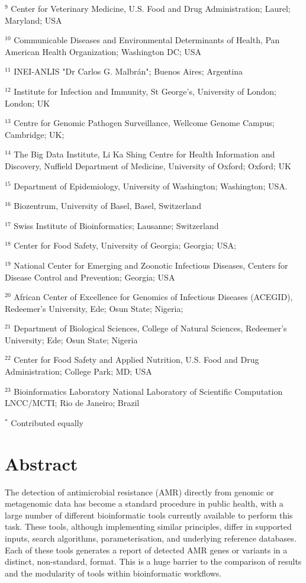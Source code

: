$^9$ Center for Veterinary Medicine, U.S. Food and Drug Administration; Laurel; Maryland; USA

$^{10}$ Communicable Diseases and Environmental Determinants of Health, Pan American Health Organization; Washington DC; USA

$^{11}$ INEI-ANLIS "Dr Carlos G. Malbrán"; Buenos Aires;  Argentina

$^{12}$ Institute for Infection and Immunity, St George’s, University of London; London; UK

$^{13}$ Centre for Genomic Pathogen Surveillance, Wellcome Genome Campus; Cambridge; UK; 

$^{14}$ The Big Data Institute, Li Ka Shing Centre for Health Information and Discovery, Nuffield Department of Medicine, University of Oxford; Oxford; UK

$^{15}$ Department of Epidemiology, University of Washington; Washington; USA.

$^{16}$ Biozentrum, University of Basel, Basel, Switzerland

$^{17}$ Swiss Institute of Bioinformatics; Lausanne; Switzerland

$^{18}$ Center for Food Safety, University of Georgia; Georgia; USA; 

$^{19}$ National Center for Emerging and Zoonotic Infectious Diseases, Centers for Disease Control and Prevention; Georgia; USA

$^{20}$ African Center of Excellence for Genomics of Infectious Diseases (ACEGID), Redeemer's University, Ede; Osun State; Nigeria; 

$^{21}$ Department of Biological Sciences, College of Natural Sciences, Redeemer's University; Ede; Osun State; Nigeria

$^{22}$ Center for Food Safety and Applied Nutrition, U.S. Food and Drug Administration; College Park; MD; USA

$^{23}$ Bioinformatics Laboratory National Laboratory of Scientific Computation LNCC/MCTI; Rio de Janeiro; Brazil

$^*$ Contributed equally 

\section{Abstract}

The detection of antimicrobial resistance (AMR) directly from genomic or metagenomic data has become a standard procedure in public health, with a large number of different bioinformatic tools currently available to perform this task. These tools, although implementing similar principles, differ in supported inputs, search algorithms, parameterisation, and underlying reference databases. Each of these tools generates a report of detected AMR genes or variants in a distinct, non-standard, format. This is a huge barrier to the comparison of results and the modularity of tools within bioinformatic workflows. 


